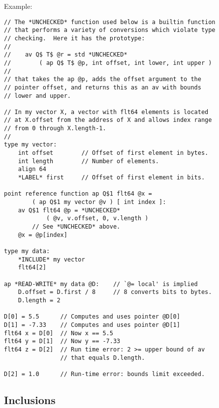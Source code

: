 \documentclass[12pt]{article}
\newenvironment{indpar}[1][0.3in]%
	{\begin{list}{}%
		     {\setlength{\itemsep}{0in}%
		      \setlength{\topsep}{0in}%
		      \setlength{\parsep}{1ex}%
		      \setlength{\labelwidth}{#1}%
		      \setlength{\leftmargin}{#1}%
		      \addtolength{\leftmargin}{\labelsep}}%
	 \item}%
	{\end{list}}
\begin{document}
Example:

\begin{indpar}\label{REFERENCE-FUNCTION-EXAMPLE}\begin{verbatim}
// The *UNCHECKED* function used below is a builtin function
// that performs a variety of conversions which violate type
// checking.  Here it has the prototype:
//
//    av Q$ T$ @r = std *UNCHECKED*
//        ( ap Q$ T$ @p, int offset, int lower, int upper )
//
// that takes the ap @p, adds the offset argument to the
// pointer offset, and returns this as an av with bounds
// lower and upper.

// In my vector X, a vector with flt64 elements is located
// at X.offset from the address of X and allows index range
// from 0 through X.length-1.
//
type my vector:
    int offset        // Offset of first element in bytes.
    int length        // Number of elements.
    align 64
    *LABEL* first     // Offset of first element in bits.

point reference function ap Q$1 flt64 @x =
        ( ap Q$1 my vector @v ) [ int index ]:
    av Q$1 flt64 @p = *UNCHECKED*
            ( @v, v.offset, 0, v.length )
        // See *UNCHECKED* above.
    @x = @p[index]

type my data:
    *INCLUDE* my vector
    flt64[2]

ap *READ-WRITE* my data @D:    // `@= local' is implied
    D.offset = D.first / 8     // 8 converts bits to bytes.
    D.length = 2

D[0] = 5.5      // Computes and uses pointer @D[0]
D[1] = -7.33    // Computes and uses pointer @D[1]
flt64 x = D[0]  // Now x == 5.5
flt64 y = D[1]  // Now y == -7.33
flt64 z = D[2]  // Run time error: 2 >= upper bound of av
                // that equals D.length.

D[2] = 1.0      // Run-time error: bounds limit exceeded.
\end{verbatim}\end{indpar}


\subsection{Inclusions}
\label{INCLUSIONS}
\end{document}
